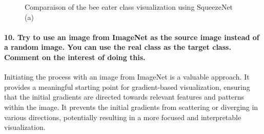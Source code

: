 \begin{figure}[H]
\begin{subfigure}[t]{.33\textwidth}
        \caption{}
        \label{fig:class_viz_lr:sub3}
    \end{subfigure}
    \caption{Comparaison of the bee eater class visualization using SqueezeNet (a) } %
    \label{fig:class_viz_lr}
\end{figure}

\paragraph*{10. Try to use an image from ImageNet as the source image instead of a random image. You can use the real class as the target class. Comment on the interest of doing this.}

Initiating the process with an image from ImageNet is a valuable approach. It provides a meaningful starting point for gradient-based visualization, ensuring that the initial gradients are directed towards relevant features and patterns within the image. It prevents the initial gradients from scattering or diverging in various directions, potentially resulting in a more focused and interpretable visualization.

